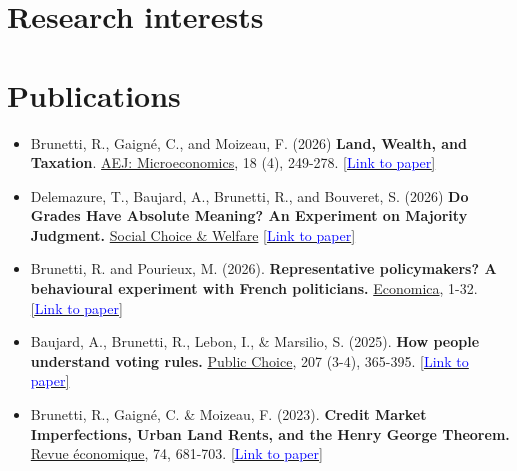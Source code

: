 \documentclass[11pt,a4paper,sans,unicode]{moderncv} %
\begin{document}







\section{Research interests}




\section{Publications}

\begin{itemize}
	\item Brunetti, R., Gaigné, C., and Moizeau, F. (2026) \textbf{Land, Wealth, and Taxation}. \underline{AEJ: Microeconomics}, 18 (4), 249-278. \href{https://www.aeaweb.org/articles?id=10.1257/mic.20240094}{[\textcolor{blue}{Link to paper}]}
	\item Delemazure, T., Baujard, A., Brunetti, R., and Bouveret, S. (2026) \textbf{Do Grades Have Absolute Meaning? An Experiment on Majority Judgment.} \underline{Social Choice \& Welfare} \href{https://doi.org/10.1007/s00355-026-01665-7}{[\textcolor{blue}{Link to paper}]}
	\item Brunetti, R. and Pourieux, M. (2026). \textbf{Representative policymakers? A behavioural experiment with French politicians.} \underline{Economica}, 1-32. \href{https://onlinelibrary.wiley.com/doi/full/10.1111/ecca.70043}{[\textcolor{blue}{Link to paper}]}
    \item Baujard, A., Brunetti, R., Lebon, I., \& Marsilio, S. (2025). \textbf{How people understand voting rules.} \underline{Public Choice}, 207 (3-4), 365-395. \href{https://link.springer.com/article/10.1007/s11127-025-01344-8}{[\textcolor{blue}{Link to paper}]}
    \item Brunetti, R., Gaigné, C. \& Moizeau, F. (2023). \textbf{Credit Market Imperfections, Urban Land Rents, and the Henry George Theorem.} \underline{Revue économique}, 74, 681-703. \href{https://www.cairn.info/revue-economique-2023-5-page-681.htm}{[\textcolor{blue}{Link to paper}]}
\end{itemize}
\end{document}

